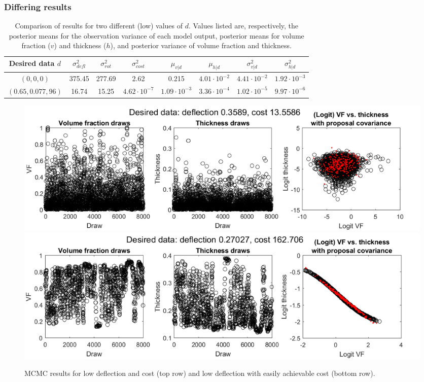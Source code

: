 \documentclass{article}
\begin{document}
\subsubsection{Differing results}
\begin{table}[h]
\centering
\begin{tabular}{| c | c  | c  |  c | c  | c | c | c |}
\hline
Desired data $d$ & $\sigma^2_{defl}$ & $\sigma^2_{rot}$ & $\sigma^2_{cost}$ & $\mu_{v|d}$ &
                            $\mu_{h|d}$ & $\sigma^2_{v|d}$ & $\sigma^2_{h|d}$\\
\hline
$(0, 0, 0)$ & 375.45 & 277.69 & 2.62 & 0.215 & $4.01 \cdot 10^{-2}$&
	$4.41\cdot 10^{-2}$ & $1.92 \cdot 10^{-3}$\\
$(0.65, 0.077, 96)$ & 16.74 & 15.25 & $4.62 \cdot 10^{-7}$ &
	$1.09 \cdot 10^{-3}$ & $3.36 \cdot10^{-4}$ &
	$1.02 \cdot 10^{-5}$ & $9.97 \cdot 10^{-6}$\\
\hline
\end{tabular}
\caption{Comparison of results for two different (low) values of $d$. Values listed are, respectively, the posterior means for the observation variance of each model output, posterior means for volume fraction ($v$) and thickness ($h$), and posterior variance of volume fraction and thickness.}
\label{table:d_comp}
\end{table}

\begin{figure}
\centering
\includegraphics[width=.9\linewidth]{FIG1}
\includegraphics[width=.9\linewidth]{FIG2}
\caption{MCMC results for low deflection and cost (top row) and low deflection with easily achievable cost (bottom row).}
\label{fig:des_data}
\end{figure}
\end{document}
